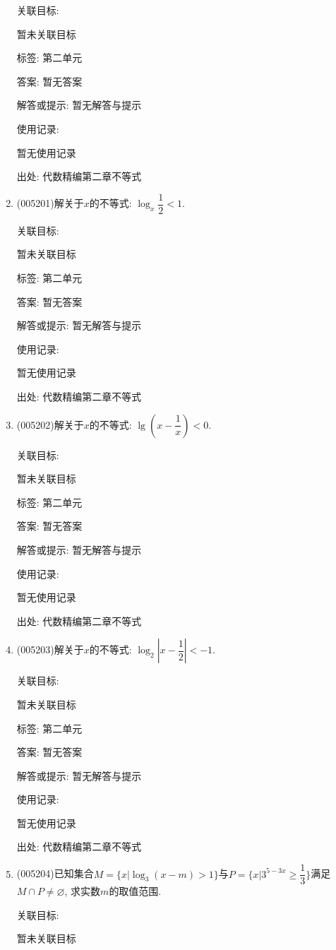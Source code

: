 \documentclass[10pt,a4paper]{article}
\begin{document}
\begin{enumerate}[1.]
关联目标:

暂未关联目标



标签: 第二单元

答案: 暂无答案

解答或提示: 暂无解答与提示

使用记录:

暂无使用记录


出处: 代数精编第二章不等式
\item { (005201)}解关于$x$的不等式: $\log_x\dfrac 12<1$.


关联目标:

暂未关联目标



标签: 第二单元

答案: 暂无答案

解答或提示: 暂无解答与提示

使用记录:

暂无使用记录


出处: 代数精编第二章不等式
\item { (005202)}解关于$x$的不等式: $\lg (x-\dfrac 1x)<0$.


关联目标:

暂未关联目标



标签: 第二单元

答案: 暂无答案

解答或提示: 暂无解答与提示

使用记录:

暂无使用记录


出处: 代数精编第二章不等式
\item { (005203)}解关于$x$的不等式: $\log_2|x-\dfrac 12|<-1$.


关联目标:

暂未关联目标



标签: 第二单元

答案: 暂无答案

解答或提示: 暂无解答与提示

使用记录:

暂无使用记录


出处: 代数精编第二章不等式
\item { (005204)}已知集合$M=\{x|\log_3(x-m)>1\}$与$P=\{x|3^{5-3x} \ge \dfrac 13\}$满足$M\cap P\ne \varnothing$, 求实数$m$的取值范围.


关联目标:

暂未关联目标




\end{enumerate}
\end{document}
